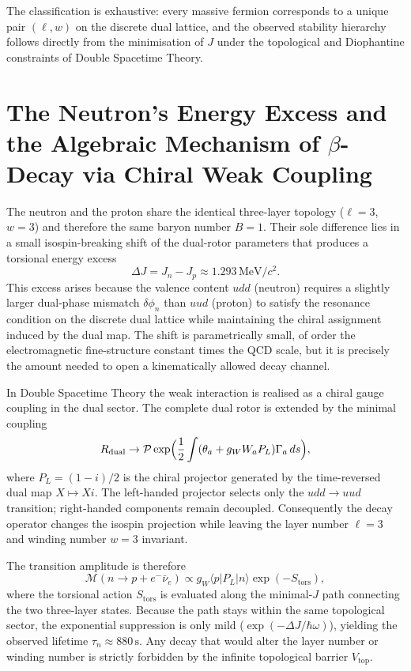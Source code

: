 \documentclass[a4paper]{article}
\begin{document}
The classification is exhaustive: every massive fermion corresponds to a unique pair \((\ell,w)\) on the discrete dual lattice, and the observed stability hierarchy follows directly from the minimisation of \(J\) under the topological and Diophantine constraints of Double Spacetime Theory.

\section{The Neutron's Energy Excess and the Algebraic Mechanism of \texorpdfstring{$\beta$}{beta}-Decay via Chiral Weak Coupling}

The neutron and the proton share the identical three-layer topology (\(\ell=3\), \(w=3\)) and therefore the same baryon number \(B=1\). Their sole difference lies in a small isospin-breaking shift of the dual-rotor parameters that produces a torsional energy excess
\[
\Delta J = J_n - J_p \approx 1.293\,\mathrm{MeV}/c^2.
\]
This excess arises because the valence content \(udd\) (neutron) requires a slightly larger dual-phase mismatch \(\delta\phi_n\) than \(uud\) (proton) to satisfy the resonance condition on the discrete dual lattice while maintaining the chiral assignment induced by the dual map. The shift is parametrically small, of order the electromagnetic fine-structure constant times the QCD scale, but it is precisely the amount needed to open a kinematically allowed decay channel.

In Double Spacetime Theory the weak interaction is realised as a chiral gauge coupling in the dual sector. The complete dual rotor is extended by the minimal coupling
\[
R_\text{dual} \to \mathcal{P}\exp\Bigl(\frac12\int(\theta_a + g_W W_a P_L)\Gamma_a\,ds\Bigr),
\]
where \(P_L = (1-i)/2\) is the chiral projector generated by the time-reversed dual map \(X\mapsto Xi\). The left-handed projector selects only the \(udd\to uud\) transition; right-handed components remain decoupled. Consequently the decay operator changes the isospin projection while leaving the layer number \(\ell=3\) and winding number \(w=3\) invariant.

The transition amplitude is therefore
\[
\mathcal{M}(n\to p+e^-\bar\nu_e) \propto g_W \langle p | P_L | n \rangle \exp(-S_\text{tors}),
\]
where the torsional action \(S_\text{tors}\) is evaluated along the minimal-\(J\) path connecting the two three-layer states. Because the path stays within the same topological sector, the exponential suppression is only mild (\(\exp(-\Delta J/\hbar\omega)\)), yielding the observed lifetime \(\tau_n \approx 880\,\mathrm{s}\). Any decay that would alter the layer number or winding number is strictly forbidden by the infinite topological barrier \(V_\text{top}\).
\end{document}
